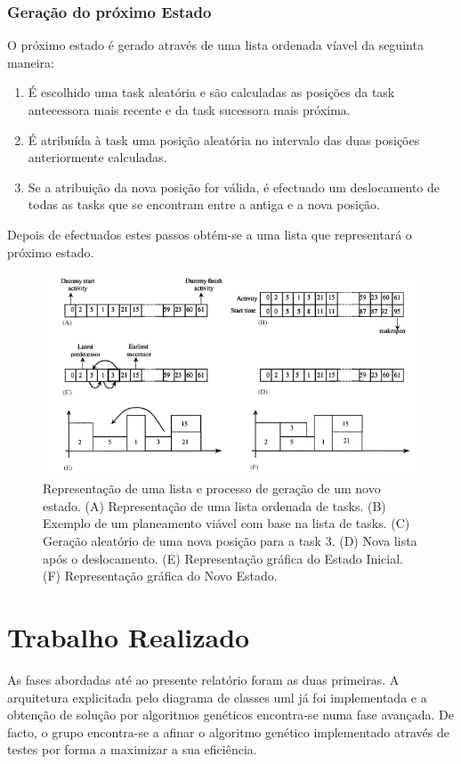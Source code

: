 \begin{titlepage}
\subsubsection{Geração do próximo Estado}

O próximo estado é gerado através de uma lista ordenada víavel da seguinta maneira:
\begin{enumerate}
\item É escolhido uma task aleatória e são calculadas as posições da task antecessora mais recente e da task sucessora mais próxima.
\item É atribuída à task uma posição aleatória no intervalo das duas posições anteriormente calculadas.
\item Se a atribuição da nova posição for válida, é efectuado um deslocamento de todas as tasks que se encontram entre a antiga e a nova posição.
\end{enumerate}

Depois de efectuados estes passos obtém-se a uma lista que representará o próximo estado. 

\begin{figure}[h!]
  \includegraphics[scale=0.8]{sa.png}
  \caption{Representação de uma lista e processo de geração de um novo estado. (A) Representação de uma lista ordenada de tasks. (B) Exemplo de um planeamento viável com base na lista de tasks. (C) Geração aleatório de uma nova posição para a task 3. (D) Nova lista após o deslocamento. (E) Representação gráfica do Estado Inicial. (F) Representação gráfica do Novo Estado.}
  \label{Simulated Annealing}
\end{figure}

\section{Trabalho Realizado}
\justify\normalsize
 As fases abordadas até ao presente relatório foram as duas primeiras. A arquitetura explicitada pelo diagrama de classes uml já foi implementada e a obtenção de solução por algoritmos genéticos encontra-se numa fase avançada. De facto, o grupo encontra-se a afinar o algoritmo genético implementado através de testes por forma a maximizar a sua eficiência.


\end{titlepage}
